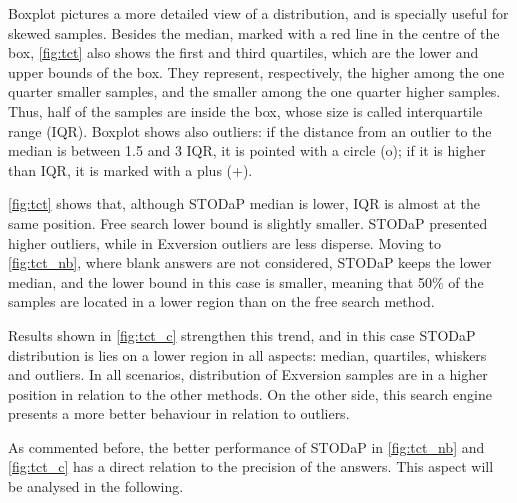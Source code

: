 Boxplot pictures a more detailed view of a distribution, and is specially useful for skewed samples.
Besides the median, marked with a red line in the centre of the box, \autoref{fig:tct} also shows the first and third quartiles, which are the lower and upper bounds of the box.
They represent, respectively, the higher among the one quarter smaller samples, and the smaller among the one quarter higher samples.
Thus, half of the samples are inside the box, whose size is called interquartile range (IQR).
Boxplot shows also outliers: if the distance from an outlier to the median is between 1.5 and 3 IQR, it is pointed with a circle (o); if it is higher than IQR, it is marked with a plus (+).

\autoref{fig:tct} shows that, although STODaP median is lower, IQR is almost at the same position.
Free search lower bound is slightly smaller.
STODaP presented higher outliers, while in Exversion outliers are less disperse.
Moving to \autoref{fig:tct_nb}, where blank answers are not considered, STODaP keeps the lower median, and the lower bound in this case is smaller, meaning that 50\% of the samples are located in a lower region than on the free search method.

Results shown in \autoref{fig:tct_c} strengthen this trend, and in this case STODaP distribution is lies on a lower region in all aspects: median, quartiles, whiskers and outliers.
In all scenarios, distribution of Exversion samples are in a higher position in relation to the other methods.
On the other side, this search engine presents a more better behaviour in relation to outliers.

As commented before, the better performance of STODaP in \autoref{fig:tct_nb} and \autoref{fig:tct_c} has a direct relation to the precision of the answers.
This aspect will be analysed in the following.


